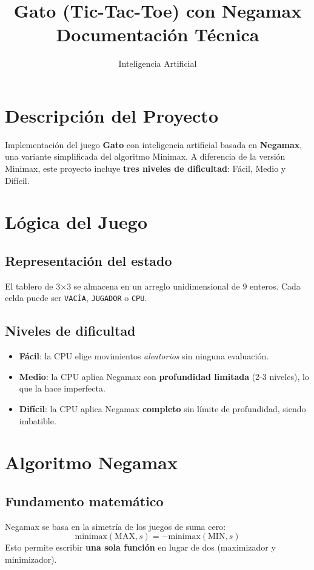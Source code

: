 \documentclass[12pt,a4paper]{article}
\title{\textbf{Gato (Tic-Tac-Toe) con Negamax}\\
  \large Documentación Técnica}
\author{Inteligencia Artificial}
\date{}
\begin{document}
\maketitle
\tableofcontents
\newpage

\section{Descripción del Proyecto}
Implementación del juego \textbf{Gato} con inteligencia artificial basada en \textbf{Negamax}, una variante simplificada del algoritmo Minimax. A diferencia de la versión Minimax, este proyecto incluye \textbf{tres niveles de dificultad}: Fácil, Medio y Difícil.

\section{Lógica del Juego}

\subsection{Representación del estado}
El tablero de 3×3 se almacena en un arreglo unidimensional de 9 enteros. Cada celda puede ser \texttt{VACÍA}, \texttt{JUGADOR} o \texttt{CPU}.

\subsection{Niveles de dificultad}

\begin{itemize}
  \item \textbf{Fácil}: la CPU elige movimientos \textit{aleatorios} sin ninguna evaluación.
  \item \textbf{Medio}: la CPU aplica Negamax con \textbf{profundidad limitada} (2-3 niveles), lo que la hace imperfecta.
  \item \textbf{Difícil}: la CPU aplica Negamax \textbf{completo} sin límite de profundidad, siendo imbatible.
\end{itemize}

\section{Algoritmo Negamax}

\subsection{Fundamento matemático}
Negamax se basa en la simetría de los juegos de suma cero:
\[
  \text{minimax}(\text{MAX}, s) = -\text{minimax}(\text{MIN}, s)
\]
Esto permite escribir \textbf{una sola función} en lugar de dos (maximizador y minimizador).
\end{document}
